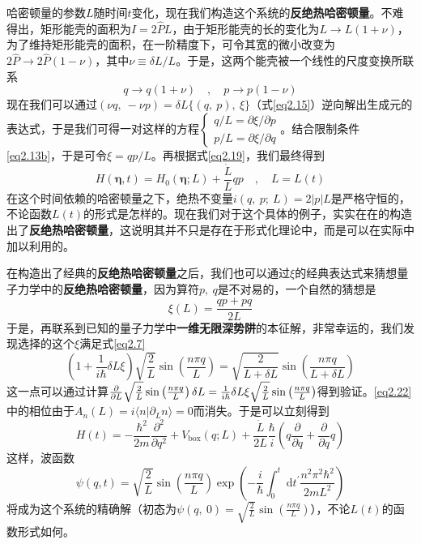 哈密顿量的参数$L$随时间$t$变化，现在我们构造这个系统的\textbf{反绝热哈密顿量}。不难得出，矩形能壳的面积为$I=2 \hat{P} L$，由于矩形能壳的长的变化为$L \to L(1+\nu)$，为了维持矩形能壳的面积，在一阶精度下，可令其宽的微小改变为$2 \hat{P} \to 2 \hat{P} (1-\nu)$，其中$\nu \equiv \delta L / L$。于是，这两个能壳被一个线性的尺度变换所联系
\begin{equation}
    q \rightarrow q(1+\nu) \quad, \quad p \rightarrow p(1-\nu)
    \label{eq2.19}
\end{equation}
现在我们可以通过$(\nu q,\ -\nu p)  = \delta L \{ (q,\ p),\ \xi \}$（式\ref{eq2.15}）逆向解出生成元的表达式，于是我们可得一对这样的方程$\left\{ \begin{array}{l} q / L=\partial \xi / \partial p \\ p / L=\partial \xi / \partial q \end{array}\right.$。结合限制条件\ref{eq2.13b}，于是可令$\xi = q p / L$。再根据式\ref{eq2.19}，我们最终得到
\begin{equation}
    H(\bm{\eta}, t)=H_{0}(\bm{\eta} ; L)+\frac{\dot{L}}{L} q p \quad, \quad L=L(t)
    \label{eq2.20}
\end{equation}
在这个时间依赖的哈密顿量之下，绝热不变量$i(q,\ p;\ L)=2 |p| L$是严格守恒的，不论函数$L(t)$的形式是怎样的。现在我们对于这个具体的例子，实实在在的构造出了\textbf{反绝热哈密顿量}，这说明其并不只是存在于形式化理论中，而是可以在实际中加以利用的。

在构造出了经典的\textbf{反绝热哈密顿量}之后，我们也可以通过$\xi$的经典表达式来猜想量子力学中的\textbf{反绝热哈密顿量}，因为算符$p,\ q$是不对易的，一个自然的猜想是
\begin{equation}
    \xi(L) = \frac{q p + p q}{2 L}
    \label{eq2.21}
\end{equation}
于是，再联系到已知的量子力学中\textbf{一维无限深势阱}的本征解，非常幸运的，我们发现选择的这个$\xi$满足式\ref{eq2.7}
\begin{equation}
    \left(1+\frac{1}{i \hbar} \delta L \xi \right) \sqrt{\frac{2}{L}} \sin \left(\frac{n \pi q}{L}\right)=\sqrt{\frac{2}{L+\delta L}} \sin \left(\frac{n \pi q}{L+\delta L}\right)
    \label{eq2.22}
\end{equation}
这一点可以通过计算$\frac{\partial }{\partial L} \sqrt{\frac{2}{L}} \sin \left(\frac{n \pi q}{L}\right) \delta L = \frac{1}{i \hbar} \delta L \xi \sqrt{\frac{2}{L}} \sin \left(\frac{n \pi q}{L}\right)$得到验证。\ref{eq2.22}中的相位由于$A_{n}(L)=i\langle n | \partial_L  n\rangle = 0$而消失。于是可以立刻得到
\begin{equation}
    H(t)=-\frac{\hbar^{2}}{2 m} \frac{\partial^{2}}{\partial q^{2}}+V_{\mathrm{box}}(q ; L)+\frac{\dot{L}}{2 L} \frac{\hbar}{i}\left(q \frac{\partial}{\partial q}+\frac{\partial}{\partial q} q\right)
    \label{eq2.23}
\end{equation}
这样，波函数
\begin{equation}
    \psi (q, t)=\sqrt{\frac{2}{L}} \sin \left(\frac{n \pi q}{L}\right) \exp \left(-\frac{i}{\hbar} \int_{0}^{t} \mathrm{~d} t^{\prime} \frac{n^{2} \pi^{2} \hbar^{2}}{2 m L^{2}}\right)
    \label{eq2.24}
\end{equation}
将成为这个系统的精确解（初态为$\psi (q,\ 0) = \sqrt{\frac{2}{L}} \sin \left(\frac{n \pi q}{L}\right)$），不论$L(t)$的函数形式如何。

